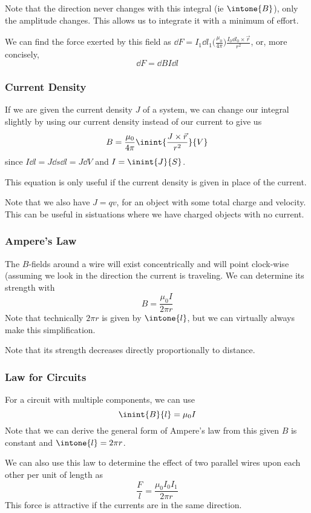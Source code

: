 \documentclass[12pt]{article}
\begin{document}
Note that the direction never changes with this integral (ie $\intone{B}$), only the amplitude changes. This allows us to integrate it with a minimum of effort.

We can find the force exerted by this field as $\dd F = I_1 \dd l_1 \bigl( \frac{\mu_0}{4\pi} \bigl) \frac{I_0 \dd l_0 \times \vec{r}}{r^2}$, or, more concisely, \[ \dd F = \dd B I \dd l \]

\subsubsection*{Current Density}
If we are given the current density $J$ of a system, we can change our integral slightly by using our current density instead of our current to give us \[ B = \frac{\mu_0}{4\pi} \inint{\frac{J \times \vec{r}}{r^2}}{V} \] since $I \dd l = J \dd s \dd l = J \dd V$ and $I = \inint{J}{S}$.

This equation is only useful if the current density is given in place of the current.

Note that we also have $J = qv$, for an object with some total charge and velocity. This can be useful in sistuations where we have charged objects with no current.

\subsubsection*{Ampere's Law}
The $B$-fields around a wire will exist concentrically and will point clock-wise (assuming we look in the direction the current is traveling. We can determine its strength with \[ B = \frac{\mu_0 I}{2\pi r} \] Note that technically $2\pi r$ is given by $\intone{l}$, but we can virtually always make this simplification.

Note that its strength decreases directly proportionally to distance.

\subsubsection*{Law for Circuits}
For a circuit with multiple components, we can use \[ \inint{B}{l} = \mu_0 I \] Note that we can derive the general form of Ampere's law from this given $B$ is constant and $\intone{l} = 2\pi r$.

We can also use this law to determine the effect of two parallel wires upon each other per unit of length as \[ \frac{F}{l} = \frac{\mu_0 I_0 I_1}{2\pi r} \] This force is attractive if the currents are in the same direction.
\end{document}
